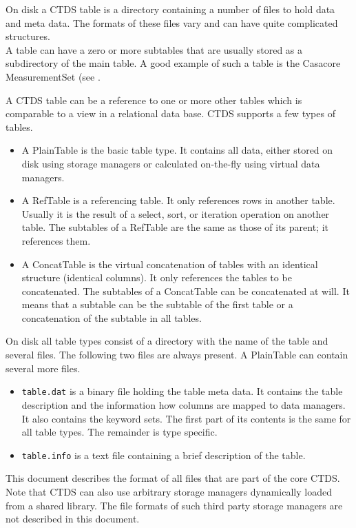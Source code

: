 On disk a CTDS table is a directory containing
a number of files to hold data and meta data. The formats of these
files vary and can have quite complicated structures.
\\A table can have a zero or more subtables that are
usually stored as a subdirectory of the main table. A good example of
such a table is the Casacore MeasurementSet
(see .

A CTDS table can be a reference to one or more other tables which is
comparable to a view in a relational data base. 
CTDS supports a few types of tables.
\begin{itemize}
\item
A PlainTable is the basic table type. It contains all data, either
stored on disk using storage managers or calculated on-the-fly using
virtual data managers.
\item
A RefTable is a referencing table. It only references rows
in another table. Usually it is the result of a select, sort, or
iteration operation on another table.
The subtables of a RefTable are the same as those of its parent; it
references them.
\item
A ConcatTable is the virtual concatenation of tables with an identical
structure (identical columns). It only references the tables to be
concatenated.
The subtables of a ConcatTable can be concatenated at will. It means
that a subtable can be the subtable of the first table or a
concatenation of the subtable in all tables. 
\end{itemize}

On disk all table types consist of a directory with the name of the table and
several files. The following two files are always present.
A PlainTable can contain several more files.
\begin{itemize}
\item
\texttt{table.dat} is a binary file holding the table meta data.
It contains the table description and
the information how columns are mapped to data managers. It also
contains the keyword sets. The
first part of its contents is the same for all table types. The
remainder is type specific.
\item
\texttt{table.info} is a text file containing a brief
description of the table.
\end{itemize}

This document describes the format of all files that are part of the core CTDS.
Note that CTDS can also use arbitrary storage managers dynamically loaded
from a shared library. The file formats of such third party storage
managers are not described in this document.

